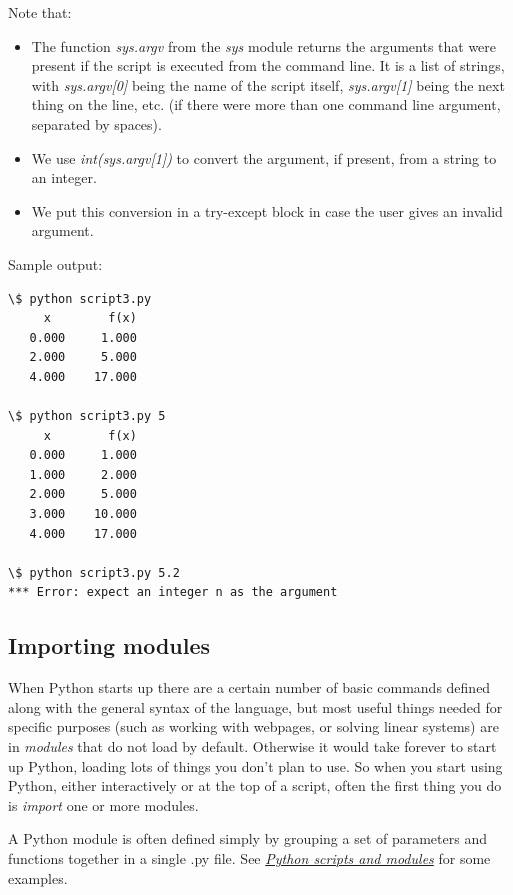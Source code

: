 \documentclass[letterpaper,10pt,english]{sphinxmanual}
\begin{document}
Note that:
\begin{itemize}
\item {} 
The function \emph{sys.argv} from the \emph{sys} module returns the arguments that
were present if the script is executed from the command line.  It is a
list of strings, with \emph{sys.argv{[}0{]}} being the name of the script itself,
\emph{sys.argv{[}1{]}} being the next thing on the line, etc. (if there were more
than one command line argument, separated by spaces).

\item {} 
We use \emph{int(sys.argv{[}1{]})} to convert the argument, if present, from a
string to an integer.

\item {} 
We put this conversion in a try-except block in case the user gives an
invalid argument.

\end{itemize}

Sample output:

\begin{Verbatim}[commandchars=\\\{\}]
\$ python script3.py
     x        f(x)
   0.000     1.000
   2.000     5.000
   4.000    17.000

\$ python script3.py 5
     x        f(x)
   0.000     1.000
   1.000     2.000
   2.000     5.000
   3.000    10.000
   4.000    17.000

\$ python script3.py 5.2
*** Error: expect an integer n as the argument
\end{Verbatim}


\subsection{Importing modules}
\label{python_scripts_modules:importing-modules}\label{python_scripts_modules:id1}
When Python starts up there are a certain number of basic commands defined
along with the general syntax of the language, but most useful things needed
for specific purposes (such as working with webpages, or solving linear
systems) are in \emph{modules} that do not load by default.  Otherwise it would
take forever to start up Python, loading lots of things you don't plan to
use.  So when you start using Python, either interactively or at the top of
a script, often the  first thing you do is \emph{import} one or more modules.

A Python module is often defined simply by grouping a set of parameters and
functions together in a single .py file.
See {\hyperref[python_scripts_modules:python-scripts-modules]{\emph{Python scripts and modules}}} for some examples.
\end{document}

